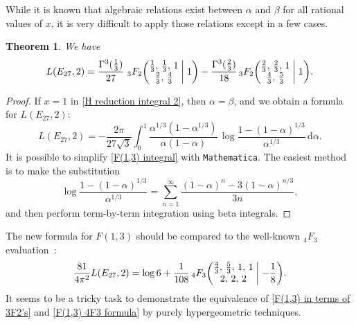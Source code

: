\documentclass[12pt,reqno]{amsart}
\newtheorem{theorem}{Theorem}
\theoremstyle{remark}
\begin{document}
While it is known that algebraic relations exist between $\alpha$
and $\beta$ for all rational values of $x$, it is very difficult
to apply those relations except in a few cases.

\begin{theorem}
We have
\begin{equation}\label{F(1,3) in terms of 3F2's}
L(E_{27},2)=\frac{\Gamma^3(\tfrac13)}{27}\,
\,{}_3F_2\biggl(\begin{matrix} \frac13, \, \frac13, \, 1 \\
\frac23, \, \frac43 \end{matrix}\biggm| 1 \biggr)
-\frac{\Gamma^3(\tfrac23)}{18}
\,{}_3F_2\biggl(\begin{matrix} \frac23, \, \frac23, \, 1 \\
\frac43, \, \frac53 \end{matrix}\biggm| 1 \biggr).
\end{equation}
\end{theorem}

\begin{proof}
If $x=1$ in \eqref{H reduction integral 2}, then $\alpha=\beta$,
and we obtain a formula for $L(E_{27},2)$:
\begin{equation}\label{F(1,3) integral}
L(E_{27},2)=-\frac{2\pi}{27\sqrt{3}}\int_{0}^{1}\frac{\alpha^{1/3}(1-\alpha^{1/3})}{\alpha(1-\alpha)}
\,\log\frac{1-(1-\alpha)^{1/3}}{\alpha^{1/3}}\,{{\mathrm d}}\alpha.
\end{equation}
It is possible to simplify \eqref{F(1,3) integral} with
\texttt{Mathematica}.  The easiest method is to make the
substitution
\begin{equation*}
\log\frac{1-(1-\alpha)^{1/3}}{\alpha^{1/3}}=\sum_{n=1}^{\infty}\frac{(1-\alpha)^{n}-3(1-\alpha)^{n/3}}{3n},
\end{equation*}
and then perform term-by-term integration using beta integrals.
\end{proof}

The new formula for $F(1,3)$ should be
compared to the well-known $_4F_3$ evaluation~\cite[Eq.~(43)]{Rgsubmit}:
\begin{equation}\label{F(1,3) 4F3 formula}
\frac{81}{4\pi^2}L(E_{27},2)=\log6 +\frac{1}{108}
\,{}_4F_3\biggl(\begin{matrix} \frac43, \, \frac53, \, 1, \, 1 \\
2, \, 2, \, 2 \end{matrix}\biggm| -\frac{1}{8} \biggr).
\end{equation}
It seems to be a tricky task to demonstrate the equivalence of
\eqref{F(1,3) in terms of 3F2's} and \eqref{F(1,3) 4F3 formula} by
purely hypergeometric techniques.
\end{document}
